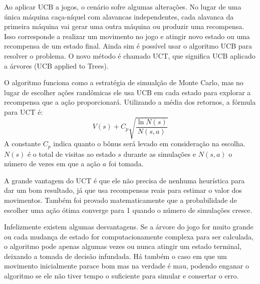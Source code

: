 Ao aplicar UCB a jogos, o cenário sofre algumas alterações. No lugar de uma única máquina caça-níquel com alavancas independentes, cada alavanca da primeira máquina vai gerar uma outra máquina ou produzir uma recompensa. Isso corresponde a realizar um movimento no jogo e atingir novo estado ou uma recompensa de um estado final. Ainda sim é possível usar o algoritmo UCB para resolver o problema. O novo método é chamado UCT\cite{uct}, que significa UCB aplicado a árvores (UCB applied to Trees). 

O algoritmo funciona como a estratégia de simualção de Monte Carlo, mas no lugar de escolher ações randômicas ele usa UCB em cada estado para explorar a recompensa que a ação proporcionará. Utilizando a média dos retornos, a fórmula para UCT é:
\begin{equation}
V(s) + C_{p}\sqrt{\frac{\ln N(s)}{N(s,a)}}
\end{equation}
A constante $C_{p}$ indica quanto o bônus será levado em consideração na escolha. $N(s)$ é o total de visitas ao estado $s$ durante as simulações e $N(s,a)$ o número de vezes em que a ação $a$ foi tomada.

A grande vantagem do UCT é que ele não precisa de nenhuma heurística para dar um bom resultado, já que usa recompensas reais para estimar o valor dos movimentos. Também foi provado matematicamente que a probabilidade de escolher uma ação ótima converge para 1 quando o número de simulações cresce. 

Infelizmente existem algumas desvantagens. Se a árvore do jogo for muito grande ou cada mudança de estado for computacionamente complexa para ser calculada, o algoritmo pode apenas algumas vezes ou nunca atingir um estado terminal, deixando a tomada de decisão infundada. Há também o caso em que um movimento inicialmente parace bom mas na verdade é mau, podendo enganar o algoritmo se ele não tiver tempo o suficiente para simular e consertar o erro. 